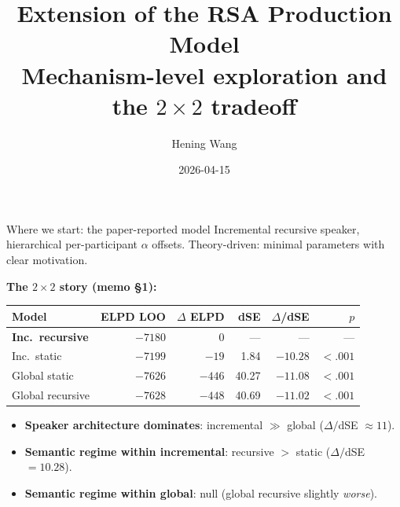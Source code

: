 \documentclass[10pt,aspectratio=169]{beamer}
\title{Extension of the RSA Production Model\\
\large Mechanism-level exploration and the $2\!\times\!2$ tradeoff}
\author{Hening Wang}
\date{2026-04-15}
\newcommand{\hl}[1]{{\color{hlblue}\textbf{#1}}}
\begin{document}
\begin{frame}
\titlepage
\end{frame}

\begin{frame}{Where we start: the paper-reported model}
\small
Incremental recursive speaker, hierarchical per-participant $\alpha$ offsets. Theory-driven: minimal parameters with clear motivation.

\vspace{0.5em}
\hl{The $2\!\times\!2$ story (memo \S1):}
\begin{center}
\begin{tabular}{lrrrrr}
\toprule
Model & ELPD LOO & $\Delta$ ELPD & dSE & $\Delta$/dSE & $p$\\
\midrule
\hl{Inc.\ recursive} & \hl{$-7180$} & $0$ & --- & --- & ---\\
Inc.\ static        & $-7199$ & $-19$ & 1.84  & $-10.28$ & $<.001$\\
Global static       & $-7626$ & $-446$ & 40.27 & $-11.08$ & $<.001$\\
Global recursive    & $-7628$ & $-448$ & 40.69 & $-11.02$ & $<.001$\\
\bottomrule
\end{tabular}
\end{center}

\vspace{0.3em}
\begin{itemize}\itemsep0.2em
  \item \hl{Speaker architecture dominates}: incremental $\gg$ global ($\Delta/$dSE $\approx 11$).
  \item \hl{Semantic regime within incremental}: recursive $>$ static ($\Delta/$dSE $= 10.28$).
  \item \hl{Semantic regime within global}: null (global recursive slightly \emph{worse}).
\end{itemize}
\end{frame}
\end{document}
